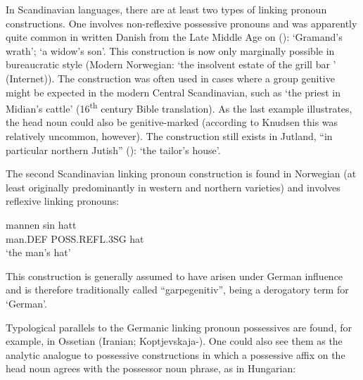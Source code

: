 
In Scandinavian languages, there are at least two types of linking pronoun constructions. One involves non-reflexive possessive pronouns and was apparently quite common in written Danish from the Late Middle Age on (\citet[61]{Knudsen1941}): ‘Gramand’s wrath’;  ‘a widow’s son’. This construction is now only marginally possible in bureaucratic style (Modern Norwegian:  ‘the insolvent estate of the grill bar ’ (Internet)). The construction was often used in cases where a group genitive might be expected in the modern Central Scandinavian, such as  ‘the priest in Midian’s cattle’ (16\textsuperscript{th} century Bible translation). As the last example illustrates, the head noun could also be genitive-marked (according to Knudsen this was relatively uncommon, however). The construction still exists in Jutland, “in particular northern Jutish” (\citet[62]{Knudsen1941}):  ‘the tailor’s house’.


The second Scandinavian linking pronoun construction is found in Norwegian (at least originally predominantly in western and northern varieties) and involves reflexive linking pronouns:


\ea\label{}
\gll mannen  sin  hatt\\
man.DEF  POSS.REFL.3SG  hat\\
\glt ‘the man’s hat’
\z

This construction is generally assumed to have arisen under German influence and is therefore traditionally called “garpegenitiv”,  being a derogatory term for ‘German’.


Typological parallels to the Germanic linking pronoun possessives are found, for example, in Ossetian (Iranian; Koptjevskaja-\citet[669]{Tamm2003}). One could also see them as the analytic analogue to possessive constructions in which a possessive affix on the head noun agrees with the possessor noun phrase, as in Hungarian:

